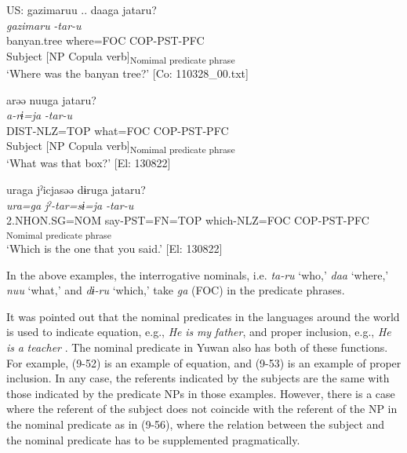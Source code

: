 \ex \label{ex:9.55b} \gllll   US:  gazimaruu  ..  daaga  jataru?\\
      \textit{gazimaru}    \textit{}  \textit{-tar-u}\\
      banyan.tree    where=FOC  COP-PST-PFC\\
      Subject    [NP  Copula verb]\textsubscript{Nomimal predicate phrase}\\
      \glt       ‘Where was the banyan tree?’ [Co: 110328\_00.txt]

\ex \label{ex:9.55c} %
    \gllll  arəə  nuuga  jataru?\\
      \textit{a-rɨ=ja}  \textit{}  \textit{-tar-u}\\
      DIST-NLZ=TOP  what=FOC  COP-PST-PFC\\
      Subject  [NP  Copula verb]\textsubscript{Nomimal predicate phrase}\\
      \glt       ‘What was that box?’ [El: 130822]

\ex \label{ex:9.55d} %
    \glll uraga  jˀicjasəə  dɨruga    jataru?\\
      \textit{ura=ga}  \textit{jˀ-tar=sɨ=ja}  \textit{} \textit{-tar-u}\\
      2.NHON.SG=NOM  say-PST=FN=TOP  which-NLZ=FOC  COP-PST-PFC\\                                                   
          [NP                                       Copula verb]\textsubscript{Nomimal predicate phrase}\\
      \glt ‘Which is the one that you said.’    [El: 130822]
    \z
\z

In the above examples, the interrogative nominals, i.e. \textit{ta-ru} ‘who,’ \textit{daa} ‘where,’ \textit{nuu} ‘what,’ and \textit{dɨ-ru} ‘which,’ take \textit{ga} (FOC) in the predicate phrases.

It was pointed out that the nominal predicates in the languages around the world is used to indicate equation, e.g., \textit{He} \textit{is} \textit{my} \textit{father}, and proper inclusion, e.g., \textit{He} \textit{is} \textit{a} \textit{teacher} \citep[114]{Payne1997}. The nominal predicate in Yuwan also has both of these functions. For example, (9-52) is an example of equation, and (9-53) is an example of proper inclusion. In any case, the referents indicated by the subjects are the same with those indicated by the predicate NPs in those examples. However, there is a case where the referent of the subject does not coincide with the referent of the NP in the nominal predicate as in (9-56), where the relation between the subject and the nominal predicate has to be supplemented pragmatically.

